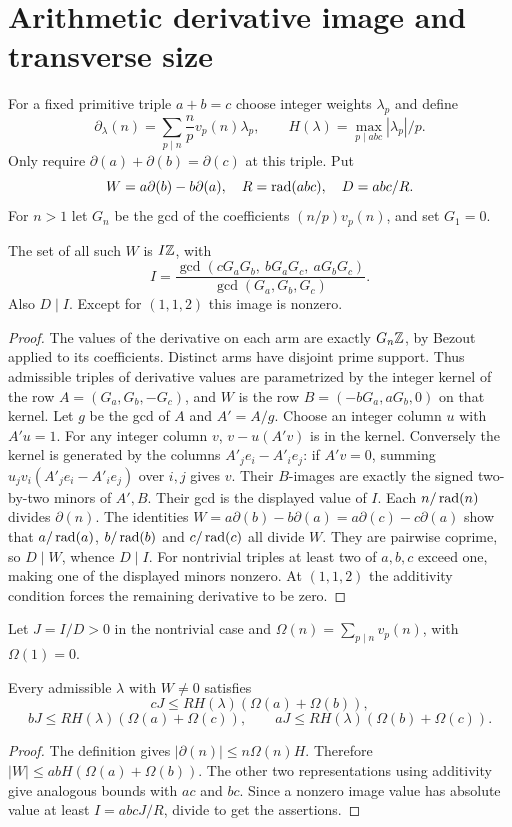 \section{Arithmetic derivative image and transverse size}
For a fixed primitive triple $a+b=c$ choose integer weights $\lambda_p$ and define
\[
 \partial_\lambda(n)=\sum_{p\mid n}\frac np v_p(n)\lambda_p,
 \qquad H(\lambda)=\max_{p\mid abc}|\lambda_p|/p.
\]
Only require $\partial(a)+\partial(b)=\partial(c)$ at this triple. Put
\[
 W=a\partial(b)-b\partial(a),\quad R=\operatorname{rad}(abc),\quad D=abc/R.
\]
For $n>1$ let $G_n$ be the gcd of the coefficients $(n/p)v_p(n)$, and set $G_1=0$.
\begin{theorem}\label{normal:thm:image}
The set of all such $W$ is $I\mathbb Z$, with
\[
 I=\frac{\gcd(cG_aG_b,\ bG_aG_c,\ aG_bG_c)}{\gcd(G_a,G_b,G_c)}.
\]
Also $D\mid I$. Except for $(1,1,2)$ this image is nonzero.
\end{theorem}
\begin{proof}
The values of the derivative on each arm are exactly $G_n\mathbb Z$, by Bezout applied to its coefficients. Distinct arms have disjoint prime support. Thus admissible triples of derivative values are parametrized by the integer kernel of the row $A=(G_a,G_b,-G_c)$, and $W$ is the row $B=(-bG_a,aG_b,0)$ on that kernel.
Let $g$ be the gcd of $A$ and $A'=A/g$. Choose an integer column $u$ with $A'u=1$. For any integer column $v$, $v-u(A'v)$ is in the kernel. Conversely the kernel is generated by the columns $A'_j e_i-A'_i e_j$: if $A'v=0$, summing $u_jv_i(A'_j e_i-A'_i e_j)$ over $i,j$ gives $v$. Their $B$-images are exactly the signed two-by-two minors of $A',B$. Their gcd is the displayed value of $I$.
Each $n/\operatorname{rad}(n)$ divides $\partial(n)$. The identities $W=a\partial(b)-b\partial(a)=a\partial(c)-c\partial(a)$ show that $a/\operatorname{rad}(a)$, $b/\operatorname{rad}(b)$ and $c/\operatorname{rad}(c)$ all divide $W$. They are pairwise coprime, so $D\mid W$, whence $D\mid I$. For nontrivial triples at least two of $a,b,c$ exceed one, making one of the displayed minors nonzero. At $(1,1,2)$ the additivity condition forces the remaining derivative to be zero.
\end{proof}
Let $J=I/D>0$ in the nontrivial case and $\Omega(n)=\sum_{p\mid n}v_p(n)$, with $\Omega(1)=0$.
\begin{theorem}\label{normal:thm:operator}
Every admissible $\lambda$ with $W\ne0$ satisfies
\[
 cJ\le RH(\lambda)(\Omega(a)+\Omega(b)),
\]
\[
 bJ\le RH(\lambda)(\Omega(a)+\Omega(c)),\qquad
 aJ\le RH(\lambda)(\Omega(b)+\Omega(c)).
\]
\end{theorem}
\begin{proof}
The definition gives $|\partial(n)|\le n\Omega(n)H$. Therefore $|W|\le abH(\Omega(a)+\Omega(b))$. The other two representations using additivity give analogous bounds with $ac$ and $bc$. Since a nonzero image value has absolute value at least $I=abcJ/R$, divide to get the assertions.
\end{proof}

